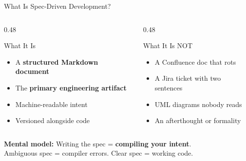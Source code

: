 \begin{frame}{What Is Spec-Driven Development?}
  \begin{columns}[T]
    \begin{column}{0.48\textwidth}
      \begin{block}{What It Is}
        \scriptsize
        \begin{itemize}
          \item A \textbf{structured Markdown document}
          \item The \textbf{primary engineering artifact}
          \item Machine-readable intent
          \item Versioned alongside code
        \end{itemize}
      \end{block}
    \end{column}
    \begin{column}{0.48\textwidth}
      \begin{alertblock}{What It Is NOT}
        \scriptsize
        \begin{itemize}
          \item A Confluence doc that rots
          \item A Jira ticket with two sentences
          \item UML diagrams nobody reads
          \item An afterthought or formality
        \end{itemize}
      \end{alertblock}
    \end{column}
  \end{columns}

  \vspace{0.3cm}

  \begin{center}
    \colorbox{rhred!10}{\parbox{0.8\textwidth}{\centering\scriptsize
      \textbf{Mental model:} Writing the spec = \textbf{compiling your intent}.\\
      Ambiguous spec = compiler errors. Clear spec = working code.
    }}
  \end{center}
\end{frame}
